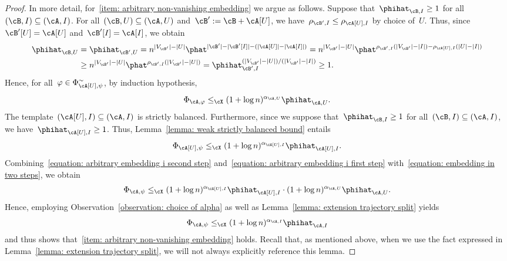\documentclass[11pt]{amsart}
\DeclarePairedDelimiter{\abs}{\lvert}{\rvert}
\newcommand{\Xleq}{\leq_{\cX}}
\def\phi{\varphi}
\theoremstyle{definition}
\numberwithin{equation}{section}
\begin{document}
\begin{proof}
		In more detail, for~\ref{item: arbitrary non-vanishing embedding} we argue as follows.
		Suppose that~$\phihat_{\cB,I}\geq 1$ for all~$(\cB,I)\subseteq (\cA,I)$.
		For all~$(\cB,U)\subseteq (\cA,U)$ and~$\cB':=\cB+\cA[U]$, we have~$\rho_{\cB',I}\leq \rho_{\cA[U],I}$ by choice of~$U$.
		Thus, since~$\cB'[U]=\cA[U]$ and~$\cB'[I]=\cA[I]$, we obtain
		\begin{align*}
			\phihat_{\cB,U}
			&=\phihat_{\cB',U}
			=n^{\abs{V_{\cB'}}-\abs{U}}\phat^{\abs{\cB'}-\abs{\cB'[I]}-(\abs{\cA[U]}-\abs{\cA[I]})}
			=n^{\abs{V_{\cB'}}-\abs{U}}\phat^{\rho_{\cB',I}(\abs{V_{\cB'}}-\abs{I})-\rho_{\cA[U],I}(\abs{U}-\abs{I})}\\
			&\geq n^{\abs{V_{\cB'}}-\abs{U}}\phat^{\rho_{\cB',I}(\abs{V_{\cB'}}-\abs{U})}
			=\phihat_{\cB',I}^{(\abs{V_{\cB'}}-\abs{U})/(\abs{V_{\cB'}}-\abs{I})}
			\geq 1.
		\end{align*} 
		Hence, for all~$\phi\in\Phi_{\cA[U],\psi}^\sim$, by induction hypothesis,
		\begin{equation}\label{equation: arbitrary embedding i second step}
			\Phi_{\cA,\phi}\Xleq (1+\log n)^{\alpha_{\cA,U}}\phihat_{\cA,U}.
		\end{equation}
		The template~$(\cA[U],I)\subseteq (\cA,I)$ is strictly balanced.
		Furthermore, since we suppose that~$\phihat_{\cB,I}\geq 1$ for all~$(\cB,I)\subseteq (\cA,I)$, we have~$\phihat_{\cA[U],I}\geq 1$.
		Thus, Lemma~\ref{lemma: weak strictly balanced bound} entails
		\begin{equation}\label{equation: arbitrary embedding i first step}
			\Phi_{\cA[U],\psi}\Xleq (1+\log n)^{\alpha_{\cA[U],I}}\phihat_{\cA[U],I}.
		\end{equation}
		Combining~\eqref{equation: arbitrary embedding i second step} and~\eqref{equation: arbitrary embedding i first step} with~\eqref{equation: embedding in two steps}, we obtain
		\begin{equation*}
			\Phi_{\cA,\psi}
			\Xleq (1+\log n)^{\alpha_{\cA[U],I}}\phihat_{\cA[U],I}\cdot (1+\log n)^{\alpha_{\cA,U}}\phihat_{\cA,U}.
		\end{equation*}
		Hence, employing Observation~\ref{observation: choice of alpha} as well as Lemma~\ref{lemma: extension trajectory split} yields
		\begin{equation*}
			\Phi_{\cA,\psi}
			\Xleq(1+\log n)^{\alpha_{\cA,I}}\phihat_{\cA,I}
		\end{equation*}
		and thus shows that~\ref{item: arbitrary non-vanishing embedding} holds.
		Recall that, as mentioned above, when we use the fact expressed in Lemma~\ref{lemma: extension trajectory split}, we will not always explicitly reference this lemma.
		

\end{proof}
\end{document}
